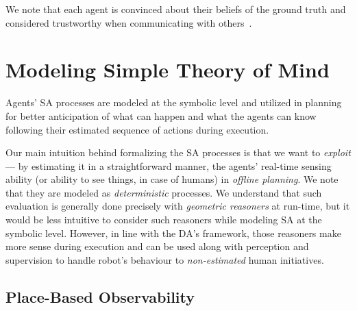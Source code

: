 \documentclass[letterpaper]{article} %
\begin{document}
We note that each agent is convinced about their beliefs of the ground truth and considered trustworthy when communicating with others~\cite{fabiano2021multi}.

\section{Modeling Simple Theory of Mind}
Agents' SA processes are modeled at the symbolic level and utilized in planning for better anticipation of what can happen and what the agents can know following their estimated sequence of actions during execution. 

Our main intuition behind formalizing the SA processes is that we want to \textit{exploit} --- by estimating it in a straightforward manner, the agents' real-time sensing ability (or ability to see things, in case of humans) in \textit{offline planning}. We note that they are modeled as \textit{deterministic} processes. 
We understand that such evaluation is generally done precisely with \textit{geometric reasoners} at run-time, but it would be less intuitive to consider such reasoners while modeling SA at the symbolic level. 
However, in line with the DA's framework, those reasoners make more sense during execution and can be used along with perception and supervision to handle robot's behaviour to \textit{non-estimated} human initiatives. 

\subsection{Place-Based Observability}




\end{document}
